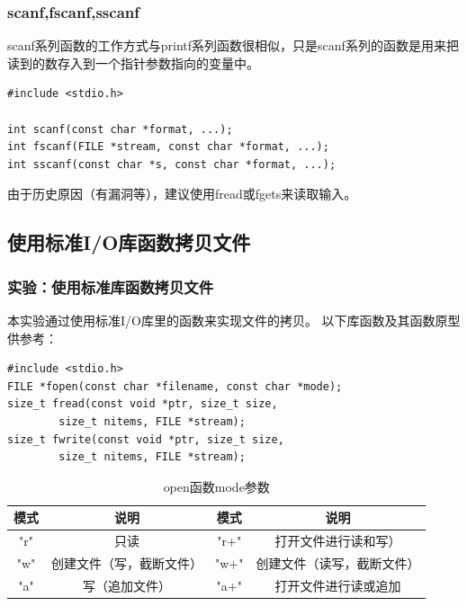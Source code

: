 \documentclass{beamer}
\begin{document}
\begin{frame}[fragile]
\frametitle{scanf,fscanf,sscanf}
scanf系列函数的工作方式与printf系列函数很相似，只是scanf系列的函数是用来把读到的数存入到一个指针参数指向的变量中。
\begin{example}
\begin{verbatim}
#include <stdio.h>

int scanf(const char *format, ...);
int fscanf(FILE *stream, const char *format, ...);
int sscanf(const char *s, const char *format, ...);
\end{verbatim}
\end{example}

由于历史原因（有漏洞等），建议使用fread或fgets来读取输入。
\end{frame}
\subsection{使用标准I/O库函数拷贝文件}
\begin{frame}[fragile]
\frametitle{实验：使用标准库函数拷贝文件}
本实验通过使用标准I/O库里的函数来实现文件的拷贝。
以下库函数及其函数原型供参考：
\begin{lstlisting}
#include <stdio.h>
FILE *fopen(const char *filename, const char *mode);
size_t fread(const void *ptr, size_t size, 
        size_t nitems, FILE *stream);
size_t fwrite(const void *ptr, size_t size, 
        size_t nitems, FILE *stream);

\end{lstlisting}
\begin{table}
\begin{tabular}{cccc}
\toprule
\textbf{模式} & \textbf{说明} & \textbf{模式} & \textbf{说明} \\
\midrule
"r" & 只读 & "r+" & 打开文件进行读和写） \\
"w" & 创建文件（写，截断文件） & "w+"& 创建文件（读写，截断文件） \\
"a" & 写（追加文件） & "a+"& 打开文件进行读或追加 \\
\bottomrule
\end{tabular}
\caption{open函数mode参数}
\end{table}

\end{frame}
\end{document}
